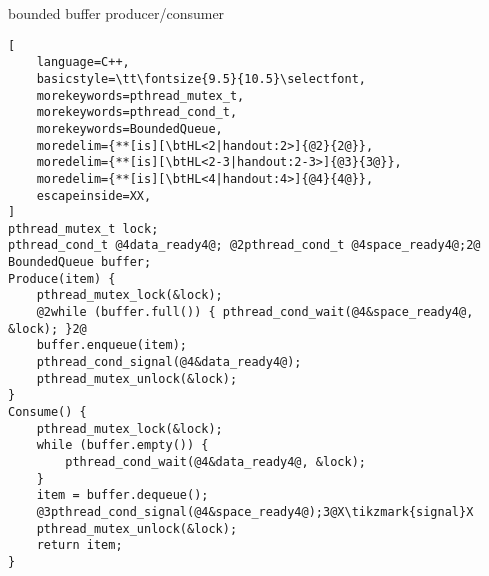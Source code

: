 \usetikzlibrary{arrows.meta,fit,matrix}

\begin{frame}[fragile,label=boundedPC]{bounded buffer producer/consumer}
\begin{lstlisting}[
    language=C++,
    basicstyle=\tt\fontsize{9.5}{10.5}\selectfont,
    morekeywords=pthread_mutex_t,
    morekeywords=pthread_cond_t,
    morekeywords=BoundedQueue,
    moredelim={**[is][\btHL<2|handout:2>]{@2}{2@}}, 
    moredelim={**[is][\btHL<2-3|handout:2-3>]{@3}{3@}}, 
    moredelim={**[is][\btHL<4|handout:4>]{@4}{4@}}, 
    escapeinside=XX,
]
pthread_mutex_t lock;
pthread_cond_t @4data_ready4@; @2pthread_cond_t @4space_ready4@;2@
BoundedQueue buffer;
Produce(item) {
    pthread_mutex_lock(&lock);
    @2while (buffer.full()) { pthread_cond_wait(@4&space_ready4@, &lock); }2@
    buffer.enqueue(item);
    pthread_cond_signal(@4&data_ready4@);
    pthread_mutex_unlock(&lock);
}
Consume() {
    pthread_mutex_lock(&lock);
    while (buffer.empty()) {
        pthread_cond_wait(@4&data_ready4@, &lock);
    }
    item = buffer.dequeue();
    @3pthread_cond_signal(@4&space_ready4@);3@X\tikzmark{signal}X
    pthread_mutex_unlock(&lock);
    return item;
}
\end{lstlisting}
\end{frame}
